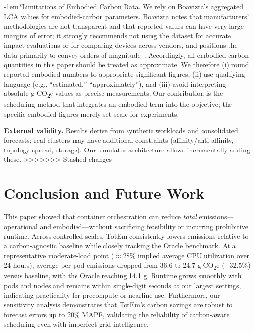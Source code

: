 \documentclass[10pt,journal,compsoc]{IEEEtran}
\makeatletter
\renewcommand{\paragraph}{\@startsection{paragraph}{4}{0pt}{1.5ex plus 1.5ex minus 0.5ex}%
{-1em}{\normalfont\normalsize\bfseries}}
\makeatother
\begin{document}
\paragraph*{Limitations of Embodied Carbon Data.}
We rely on Boavizta’s aggregated LCA values for embodied-carbon parameters. Boavizta notes that manufacturers’ methodologies are not transparent and that reported values can have very large margins of error; it strongly recommends not using the dataset for accurate impact evaluations or for comparing devices across vendors, and positions the data primarily to convey orders of magnitude~\cite{boavizta2023methodology,boavizta2023}. Accordingly, all embodied-carbon quantities in this paper should be treated as approximate. We therefore (i) round reported embodied numbers to appropriate significant figures, (ii) use qualifying language (e.g., “estimated,” “approximately”), and (iii) avoid interpreting absolute g CO\textsubscript{2}e values as precise measurements. Our contribution is the scheduling method that integrates an embodied term into the objective; the specific embodied figures merely set scale for experiments.

\textbf{External validity.} Results derive from synthetic workloads and consolidated forecasts; real clusters may have additional constraints (affinity/anti-affinity, topology spread, storage). Our simulator architecture allows incrementally adding these.
>>>>>>> Stashed changes

\section{Conclusion and Future Work}\label{s:conc}
	
This paper showed that container orchestration can reduce \emph{total} emissions—operational and embodied—without sacrificing feasibility or incurring prohibitive runtime. Across controlled scales, TotEm consistently lowers emissions relative to a carbon-agnostic baseline while closely tracking the Oracle benchmark. At a representative moderate-load point ($\approx 28$\% implied average CPU utilization over 24 hours), average per-pod emissions dropped from 36.6 to 24.7 g CO\textsubscript{2}e (\(-32.5\%\)) versus baseline, with the Oracle reaching 14.1 g. Runtime grows smoothly with pods and nodes and remains within single-digit seconds at our largest settings, indicating practicality for precompute or nearline use. Furthermore, our sensitivity analysis demonstrates that TotEm's carbon savings are robust to forecast errors up to 20\% MAPE, validating the reliability of carbon-aware scheduling even with imperfect grid intelligence.
\end{document}
